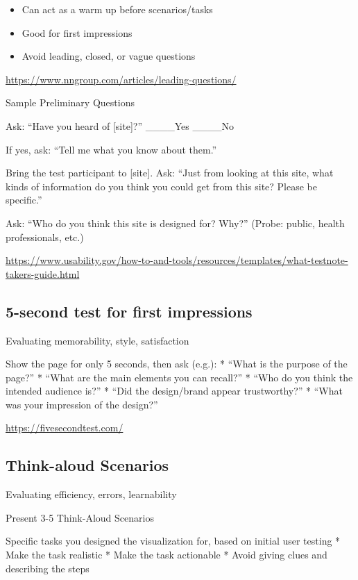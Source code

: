 \documentclass[
]{krantz}
\providecommand{\tightlist}{%
  \setlength{\itemsep}{0pt}\setlength{\parskip}{0pt}}
\begin{document}
\begin{itemize}
\tightlist
\item
  Can act as a warm up before scenarios/tasks
\item
  Good for first impressions
\item
  Avoid leading, closed, or vague questions
\end{itemize}

\url{https://www.nngroup.com/articles/leading-questions/}

Sample Preliminary Questions

Ask: ``Have you heard of {[}site{]}?''
\_\_\_\_Yes \_\_\_\_No

If yes, ask:
``Tell me what you know about them.''

Bring the test participant to {[}site{]}.
Ask:
``Just from looking at this site, what kinds of information do you think you could get from this site? Please be specific.''

Ask: ``Who do you think this site is designed for? Why?''
(Probe: public, health professionals, etc.)

\url{https://www.usability.gov/how-to-and-tools/resources/templates/what-testnote-takers-guide.html}

\hypertarget{second-test-for-first-impressions}{%
\subsection{5-second test for first impressions}\label{second-test-for-first-impressions}}

Evaluating memorability, style, satisfaction

Show the page for only 5 seconds, then ask (e.g.):
* ``What is the purpose of the page?''
* ``What are the main elements you can recall?''
* ``Who do you think the intended audience is?''
* ``Did the design/brand appear trustworthy?''
* ``What was your impression of the design?''

\url{https://fivesecondtest.com/}

\hypertarget{think-aloud-scenarios}{%
\subsection{Think-aloud Scenarios}\label{think-aloud-scenarios}}

Evaluating efficiency, errors, learnability

Present 3-5 Think-Aloud Scenarios

Specific tasks you designed the visualization for, based on initial user testing
* Make the task realistic
* Make the task actionable
* Avoid giving clues and describing the steps
\end{document}
